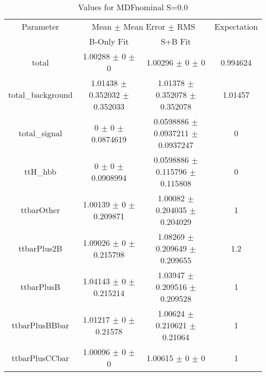 \begin{table}
\centering
\caption{Values for MDFnominal S=0.0}
\begin{tabular}{cccc}
\toprule
Parameter & \multicolumn{2}{c}{Mean $\pm$ Mean Error $\pm$ RMS} & Expectation\\
 & B-Only Fit & S+B Fit & \\
\midrule
total & \num{1.00288} $\pm$ \num{0} $\pm$ \num{0} & \num{1.00296} $\pm$ \num{0} $\pm$ \num{0} & \num{0.994624}\\
total\_background & \num{1.01438} $\pm$ \num{0.352032} $\pm$ \num{0.352033} & \num{1.01378} $\pm$ \num{0.352078} $\pm$ \num{0.352078} & \num{1.01457}\\
total\_signal & \num{0} $\pm$ \num{0} $\pm$ \num{0.0874619} & \num{0.0598886} $\pm$ \num{0.0937211} $\pm$ \num{0.0937247} & \num{0}\\
ttH\_hbb & \num{0} $\pm$ \num{0} $\pm$ \num{0.0908994} & \num{0.0598886} $\pm$ \num{0.115796} $\pm$ \num{0.115808} & \num{0}\\
ttbarOther & \num{1.00139} $\pm$ \num{0} $\pm$ \num{0.209871} & \num{1.00082} $\pm$ \num{0.204035} $\pm$ \num{0.204029} & \num{1}\\
ttbarPlus2B & \num{1.09026} $\pm$ \num{0} $\pm$ \num{0.215798} & \num{1.08269} $\pm$ \num{0.209649} $\pm$ \num{0.209655} & \num{1.2}\\
ttbarPlusB & \num{1.04143} $\pm$ \num{0} $\pm$ \num{0.215214} & \num{1.03947} $\pm$ \num{0.209516} $\pm$ \num{0.209528} & \num{1}\\
ttbarPlusBBbar & \num{1.01217} $\pm$ \num{0} $\pm$ \num{0.21578} & \num{1.00624} $\pm$ \num{0.210621} $\pm$ \num{0.21064} & \num{1}\\
ttbarPlusCCbar & \num{1.00096} $\pm$ \num{0} $\pm$ \num{0} & \num{1.00615} $\pm$ \num{0} $\pm$ \num{0} & \num{1}\\
\bottomrule
\end{tabular}
\end{table}